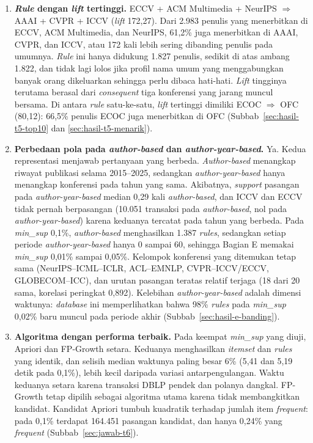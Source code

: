 \begin{enumerate}
\item \textbf{\textit{Rule} dengan \textit{lift} tertinggi.} ECCV + ACM Multimedia + NeurIPS $\Rightarrow$ AAAI + CVPR + ICCV (\textit{lift} 172,27). Dari 2.983 penulis yang menerbitkan di ECCV, ACM Multimedia, dan NeurIPS, 61,2\% juga menerbitkan di AAAI, CVPR, dan ICCV, atau 172 kali lebih sering dibanding penulis pada umumnya. \textit{Rule} ini hanya didukung 1.827 penulis, sedikit di atas ambang 1.822, dan tidak lagi lolos jika profil nama umum yang menggabungkan banyak orang dikeluarkan sehingga perlu dibaca hati-hati. \textit{Lift} tingginya terutama berasal dari \textit{consequent} tiga konferensi yang jarang muncul bersama. Di antara \textit{rule} satu-ke-satu, \textit{lift} tertinggi dimiliki ECOC $\Rightarrow$ OFC (80,12): 66,5\% penulis ECOC juga menerbitkan di OFC (Subbab~\ref{sec:hasil-t5-top10} dan \ref{sec:hasil-t5-menarik}).
\item \textbf{Perbedaan pola pada \textit{author-based} dan \textit{author-year-based}.} Ya. Kedua representasi menjawab pertanyaan yang berbeda. \textit{Author-based} menangkap riwayat publikasi selama 2015--2025, sedangkan \textit{author-year-based} hanya menangkap konferensi pada tahun yang sama. Akibatnya, \textit{support} pasangan pada \textit{author-year-based} median 0,29 kali \textit{author-based}, dan ICCV dan ECCV tidak pernah berpasangan (10.051 transaksi pada \textit{author-based}, nol pada \textit{author-year-based}) karena keduanya tercatat pada tahun yang berbeda. Pada \textit{min\_sup} 0,1\%, \textit{author-based} menghasilkan 1.387 \textit{rules}, sedangkan setiap periode \textit{author-year-based} hanya 0 sampai 60, sehingga Bagian E memakai \textit{min\_sup} 0,01\% sampai 0,05\%. Kelompok konferensi yang ditemukan tetap sama (NeurIPS--ICML--ICLR, ACL--EMNLP, CVPR--ICCV/ECCV, GLOBECOM--ICC), dan urutan pasangan teratas relatif terjaga (18 dari 20 sama, korelasi peringkat 0,892). Kelebihan \textit{author-year-based} adalah dimensi waktunya: \textit{database} ini memperlihatkan bahwa 98\% \textit{rules} pada \textit{min\_sup} 0,02\% baru muncul pada periode akhir (Subbab~\ref{sec:hasil-e-banding}).
\item \textbf{Algoritma dengan performa terbaik.} Pada keempat \textit{min\_sup} yang diuji, Apriori dan FP-Growth setara. Keduanya menghasilkan \textit{itemset} dan \textit{rules} yang identik, dan selisih median waktunya paling besar 6\% (5,41 dan 5,19 detik pada 0,1\%), lebih kecil daripada variasi antarpengulangan. Waktu keduanya setara karena transaksi DBLP pendek dan polanya dangkal. FP-Growth tetap dipilih sebagai algoritma utama karena tidak membangkitkan kandidat. Kandidat Apriori tumbuh kuadratik terhadap jumlah item \textit{frequent}: pada 0,1\% terdapat 164.451 pasangan kandidat, dan hanya 0,24\% yang \textit{frequent} (Subbab~\ref{sec:jawab-t6}).

\end{enumerate}
